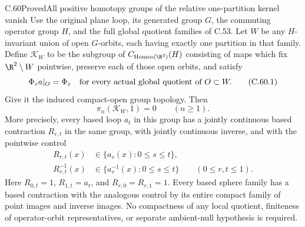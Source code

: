 \begin{claim}{C.60}{Proved}{All positive homotopy groups of the relative one-partition kernel vanish}
Use the original plane loop, its generated group $G$,
the commuting operator group $H$, and the full global
quotient families of C.53.
Let $W$ be any $H$-invariant union of open $G$-orbits,
each having exactly one partition in that family.
Define $\mathcal K_W$ to be the subgroup of
$C_{\operatorname{Homeo}(\R^2)}(H)$ consisting of maps
which fix $\R^2\setminus W$ pointwise, preserve each
of those open orbits, and satisfy
\[
                 \Phi_z a|_O=\Phi_z
 \quad\hbox{for every actual global quotient of }O\subset W.
                                                               \tag{C.60.1}
\]
Give it the induced compact-open group topology.
Then
\[
                 \pi_n(\mathcal K_W,1)=0
                         \qquad(n\geq1).               \tag{C.60.2}
\]
More precisely, every based loop $a_t$ in this group
has a jointly continuous based contraction $R_{r,t}$
in the same group, with jointly continuous inverse,
and with the pointwise control
\[
 \begin{split}
 R_{r,t}(x)&\in\{a_s(x):0\leq s\leq t\},\\
 R_{r,t}^{-1}(x)&\in\{a_s^{-1}(x):0\leq s\leq t\}
 \qquad(0\leq r,t\leq1).
 \end{split}                                             \tag{C.60.3}
\]
Here $R_{0,t}=1$, $R_{1,t}=a_t$, and
$R_{r,0}=R_{r,1}=1$.
Every based sphere family has a based contraction
with the analogous control by its entire compact
family of point images and inverse images.
No compactness of any local quotient, finiteness of
operator-orbit representatives, or separate ambient-null
hypothesis is required.
\end{claim}

